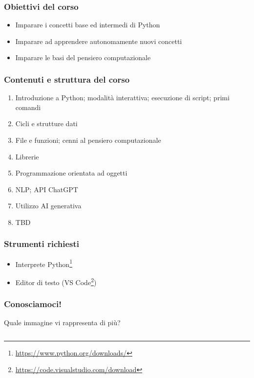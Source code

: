 
\begin{contentframe}
    \frametitle{Obiettivi del corso}

    \begin{itemize}
        \item Imparare i concetti base ed intermedi di Python
        
        \bigskip
        \item Imparare ad apprendere autonomamente nuovi concetti

        \bigskip
        \item Imparare le basi del pensiero computazionale
    \end{itemize}
\end{contentframe}

\begin{contentframe}
    \frametitle{Contenuti e struttura del corso}

    \begin{enumerate}
        \item Introduzione a Python; modalità interattiva; esecuzione di script; primi comandi
        \item Cicli e strutture dati
        \item File e funzioni; cenni al pensiero computazionale
        \item Librerie
        \item Programmazione orientata ad oggetti
        \item NLP; API ChatGPT
        \item Utilizzo AI generativa
        \item TBD
    \end{enumerate}
\end{contentframe}

\begin{contentframe}
    \frametitle{Strumenti richiesti}

    \begin{itemize}    
        \item Interprete Python\footnote[frame]{\url{https://www.python.org/downloads/}}
        \item Editor di testo (VS Code\footnote[frame]{\url{https://code.visualstudio.com/download}})
    \end{itemize}
\end{contentframe}

\begin{contentframe}
    \frametitle{Conosciamoci!}
    
    Quale immagine vi rappresenta di più?

    \bigskip
    \begin{columns}
        \centering
        
        \centering
        
        \centering
    \end{columns}
\end{contentframe}

